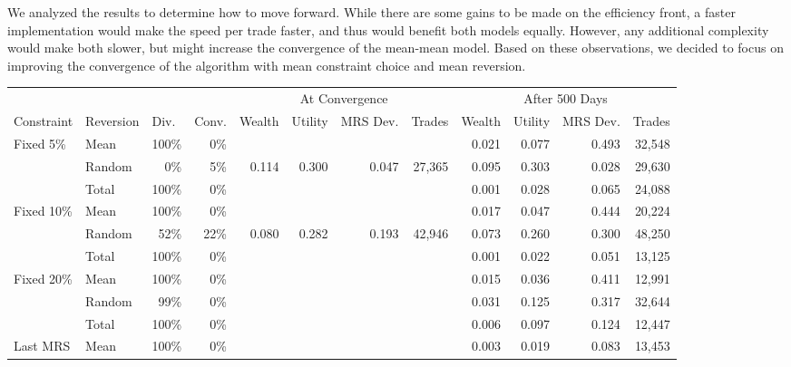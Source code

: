 \documentclass[12pt,a4paper,titlepage]{article}
\begin{document}
We analyzed the results to determine how to move forward.
While there are some gains to be made on the efficiency front, a faster implementation would make the speed per trade faster, and thus would benefit both models equally.
However, any additional complexity would make both slower, but might increase the convergence of the mean-mean model.
Based on these observations, we decided to focus on improving the convergence of the algorithm with mean constraint choice and mean reversion.


\begin{table}
  \begin{tabular}{ll|rr|rrrr|rrrr}
    &  & \multicolumn{1}{|l}{} & \multicolumn{1}{l|}{} & \multicolumn{ 4}{c|}{At Convergence} & \multicolumn{ 4}{c}{After 500 Days} \\
    Constraint & Reversion & \multicolumn{1}{l}{Div.} & \multicolumn{1}{l|}{Conv.} & \multicolumn{1}{l}{Wealth} & \multicolumn{1}{l}{Utility} & \multicolumn{1}{l}{MRS Dev.} & \multicolumn{1}{l|}{Trades} & \multicolumn{1}{l}{Wealth} & \multicolumn{1}{l}{Utility} & \multicolumn{1}{l}{MRS Dev.} & \multicolumn{1}{l}{Trades} \\ 
    \hline
    \multicolumn{ 1}{l}{Fixed 5\%} & Mean & 100\% & 0\% &  &  &  &  & 0.021 & 0.077 & 0.493 & 32,548 \\
    \multicolumn{ 1}{l}{} & Random & 0\% & 5\% & 0.114 & 0.300 & 0.047 & 27,365 & 0.095 & 0.303 & 0.028 & 29,630 \\
    \multicolumn{ 1}{l}{} & Total & 100\% & 0\% &  &  &  &  & 0.001 & 0.028 & 0.065 & 24,088 \\
    \multicolumn{ 1}{l}{Fixed 10\%} & Mean & 100\% & 0\% &  &  &  &  & 0.017 & 0.047 & 0.444 & 20,224 \\
    \multicolumn{ 1}{l}{} & Random & 52\% & 22\% & 0.080 & 0.282 & 0.193 & 42,946 & 0.073 & 0.260 & 0.300 & 48,250 \\
    \multicolumn{ 1}{l}{} & Total & 100\% & 0\% &  &  &  &  & 0.001 & 0.022 & 0.051 & 13,125 \\
    \multicolumn{ 1}{l}{Fixed 20\%} & Mean & 100\% & 0\% &  &  &  &  & 0.015 & 0.036 & 0.411 & 12,991 \\
    \multicolumn{ 1}{l}{} & Random & 99\% & 0\% &  &  &  &  & 0.031 & 0.125 & 0.317 & 32,644 \\
    \multicolumn{ 1}{l}{} & Total & 100\% & 0\% &  &  &  &  & 0.006 & 0.097 & 0.124 & 12,447 \\
    \multicolumn{ 1}{l}{Last MRS} & Mean & 100\% & 0\% &  &  & &  & 0.003 & 0.019 & 0.083 & 13,453 \\

\end{tabular}
\end{table}
\end{document}
